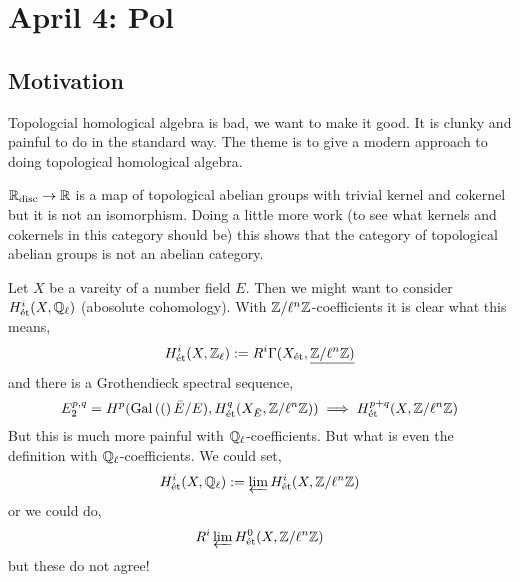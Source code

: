 \documentclass[12pt]{article}
\begin{document}
\section{April 4: Pol}

\subsection{Motivation}

Topologcial homological algebra is bad, we want to make it good. It is clunky and painful to do in the standard way. The theme is to give a modern approach to doing topological homological algebra.

\begin{example}
$\mathbb{R}_{\text{disc}} \to \mathbb{R}$ is a map of topological abelian groups with trivial kernel and cokernel but it is not an isomorphism. Doing a little more work (to see what kernels and cokernels in this category should be) this shows that the category of topological abelian groups is not an abelian category. 
\end{example}

\begin{example}
Let $X$ be a vareity of a number field $E$. Then we might want to consider $H^i_{\text{\'{e}t}}(X, \mathbb{Q}_\ell)$ (abosolute \etale cohomology). With $\mathbb{Z}/\ell^n \mathbb{Z}$-coefficients it is clear what this means,
\[ H^i_{\text{\'{e}t}}(X, \mathbb{Z}_\ell) := R^i \Gamma(X_{\text{\'{e}t}}, \underline{\mathbb{Z} / \ell^n \mathbb{Z})} \]
and there is a Grothendieck spectral sequence,
\[ E_2^{p,q} = H^p(\mathrm{Gal}\left( ( \right)\bar{E}/E), H^q_{\text{\'{e}t}}(X_{\bar{E}}, \mathbb{Z} / \ell^n \mathbb{Z})) \implies H^{p+q}_{\text{\'{e}t}}(X, \mathbb{Z} / \ell^n \mathbb{Z}) \]
But this is much more painful with $\mathbb{Q}_\ell$-coefficients. But what is even the definition with $\mathbb{Q}_\ell$-coefficients. We could set,
\[ H^i_{\text{\'{e}t}}(X, \mathbb{Q}_\ell) := \operatorname*{\varprojlim} H^i_{\text{\'{e}t}}(X, \mathbb{Z} / \ell^n \mathbb{Z}) \]
or we could do,
\[ R^i \operatorname*{\varprojlim} H^0_{\text{\'{e}t}}(X, \mathbb{Z} / \ell^n \mathbb{Z}) \]
but these do not agree!
\end{example}
\end{document}

